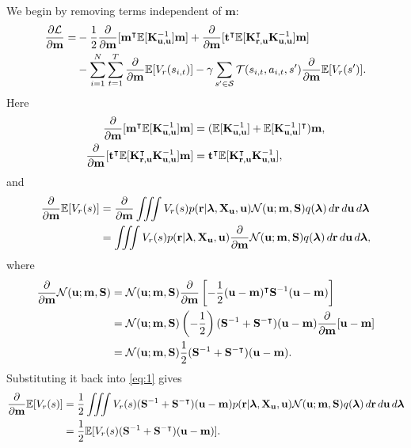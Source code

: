 \documentclass{mprop}
\theoremstyle{definition}
\begin{document}
We begin by removing terms independent of $\mathbf{m}$:
\[
  \begin{split}
    \frac{\partial\mathcal{L}}{\partial\mathbf{m}} =
    &- \frac{1}{2}\frac{\partial}{\partial\mathbf{m}}[\mathbf{m}^\intercal\mathbb{E}[\mathbf{K}_{\mathbf{u},\mathbf{u}}^{-1}]\mathbf{m}]
    + \frac{\partial}{\partial\mathbf{m}}[\mathbf{t}^\intercal\mathbb{E}[\mathbf{K}_{\mathbf{r},\mathbf{u}}^\intercal\mathbf{K}_{\mathbf{u},\mathbf{u}}^{-1}]\mathbf{m}] \\
    &- \sum_{i=1}^N \sum_{t=1}^T \frac{\partial}{\partial\mathbf{m}}\mathbb{E}[V_r(s_{i,t})] -
      \gamma\sum_{s' \in \mathcal{S}} \mathcal{T}(s_{i,t}, a_{i,t},
      s')\frac{\partial}{\partial\mathbf{m}}\mathbb{E}[V_r(s')].
  \end{split}
\]
Here
\begin{align*}
  \frac{\partial}{\partial\mathbf{m}}[\mathbf{m}^\intercal\mathbb{E}[\mathbf{K}_{\mathbf{u},\mathbf{u}}^{-1}]\mathbf{m}] &= (\mathbb{E}[\mathbf{K}_{\mathbf{u},\mathbf{u}}^{-1}] + \mathbb{E}[\mathbf{K}_{\mathbf{u},\mathbf{u}}^{-1}]^\intercal)\mathbf{m}, \\
  \frac{\partial}{\partial\mathbf{m}}[\mathbf{t}^\intercal\mathbb{E}[\mathbf{K}_{\mathbf{r},\mathbf{u}}^\intercal\mathbf{K}_{\mathbf{u},\mathbf{u}}^{-1}]\mathbf{m}] &= \mathbf{t}^\intercal\mathbb{E}[\mathbf{K}_{\mathbf{r},\mathbf{u}}^\intercal\mathbf{K}_{\mathbf{u},\mathbf{u}}^{-1}],
\end{align*}
and
\begin{equation} \label{eq:1}
  \begin{split}
    \frac{\partial}{\partial\mathbf{m}}\mathbb{E}[V_r(s)] &= \frac{\partial}{\partial\mathbf{m}}\iiint V_r(s) p(\mathbf{r} | \bm\lambda,
    \mathbf{X_u}, \mathbf{u}) \mathcal{N}(\mathbf{u}; \mathbf{m}, \mathbf{S})
    q(\bm\lambda)\,d\mathbf{r}\,d\mathbf{u}\,d\bm\lambda \\
    &= \iiint V_r(s) p(\mathbf{r} | \bm\lambda,
    \mathbf{X_u}, \mathbf{u}) \frac{\partial}{\partial\mathbf{m}}\mathcal{N}(\mathbf{u}; \mathbf{m}, \mathbf{S})
    q(\bm\lambda)\,d\mathbf{r}\,d\mathbf{u}\,d\bm\lambda,
  \end{split}
\end{equation}
where
\[
  \begin{split}
    \frac{\partial}{\partial\mathbf{m}}\mathcal{N}(\mathbf{u}; \mathbf{m}, \mathbf{S}) &=
    \mathcal{N}(\mathbf{u}; \mathbf{m},
    \mathbf{S})\frac{\partial}{\partial\mathbf{m}}\left[-\frac{1}{2}(\mathbf{u} -
      \mathbf{m})^\intercal\mathbf{S}^{-1}(\mathbf{u} - \mathbf{m})\right] \\
    &= \mathcal{N}(\mathbf{u}; \mathbf{m},
    \mathbf{S})\left(-\frac{1}{2}\right)(\mathbf{S}^{-1} +
    \mathbf{S}^{-\intercal})(\mathbf{u} - \mathbf{m})\frac{\partial}{\partial\mathbf{m}}[\mathbf{u} -
    \mathbf{m}] \\
    &= \mathcal{N}(\mathbf{u}; \mathbf{m},
    \mathbf{S})\frac{1}{2}(\mathbf{S}^{-1} + \mathbf{S}^{-\intercal})(\mathbf{u}
    - \mathbf{m}).
  \end{split}
\]
Substituting it back into \eqref{eq:1} gives
\[
  \begin{split}
    \frac{\partial}{\partial\mathbf{m}}\mathbb{E}[V_r(s)] &= \frac{1}{2}\iiint V_r(s)
    (\mathbf{S}^{-1} + \mathbf{S}^{-\intercal})(\mathbf{u} - \mathbf{m})
    p(\mathbf{r} | \bm\lambda, \mathbf{X_u}, \mathbf{u}) \mathcal{N}(\mathbf{u};
    \mathbf{m}, \mathbf{S})
    q(\bm\lambda)\,d\mathbf{r}\,d\mathbf{u}\,d\bm\lambda \\
    &= \frac{1}{2}\mathbb{E}[V_r(s) (\mathbf{S}^{-1} +
    \mathbf{S}^{-\intercal})(\mathbf{u} - \mathbf{m})].
\end{split}
\]
\end{document}
